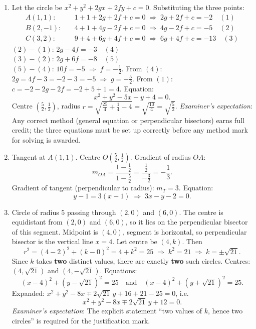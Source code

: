 \documentclass[11pt]{article}
\begin{document}
\begin{corrige}
\begin{enumerate}
\item Let the circle be $x^2 + y^2 + 2gx + 2fy + c = 0$. Substituting the three points:
\begin{align*}
A(1,1):&\quad 1+1+2g+2f+c = 0 \;\Longrightarrow\; 2g+2f+c = -2 \quad (1)\\
B(2,-1):&\quad 4+1+4g-2f+c = 0 \;\Longrightarrow\; 4g-2f+c = -5 \quad (2)\\
C(3,2):&\quad 9+4+6g+4f+c = 0 \;\Longrightarrow\; 6g+4f+c = -13 \quad (3)
\end{align*}
$(2)-(1)$: $2g - 4f = -3 \quad (4)$\\
$(3)-(2)$: $2g + 6f = -8 \quad (5)$\\
$(5)-(4)$: $10f = -5 \;\Longrightarrow\; f = -\frac{1}{2}$.
From $(4)$: $2g = 4f - 3 = -2 - 3 = -5 \;\Longrightarrow\; g = -\frac{5}{2}$.
From $(1)$: $c = -2 - 2g - 2f = -2 + 5 + 1 = 4$.
Equation:
\[ \boxed{x^2 + y^2 - 5x - y + 4 = 0.} \]
Centre $\left(\frac{5}{2}, \frac{1}{2}\right)$, radius $r = \sqrt{\frac{25}{4} + \frac{1}{4} - 4} = \sqrt{\frac{10}{4}} = \sqrt{\frac{5}{2}}$.
\emph{Examiner's expectation}: Any correct method (general equation or perpendicular bisectors) earns full credit; the three equations must be set up correctly before any method mark for solving is awarded.

\item Tangent at $A(1,1)$. Centre $O\left(\frac{5}{2}, \frac{1}{2}\right)$.
Gradient of radius $OA$:
\[ m_{OA} = \frac{1 - \frac{1}{2}}{1 - \frac{5}{2}} = \frac{\frac{1}{2}}{-\frac{3}{2}} = -\frac{1}{3}. \]
Gradient of tangent (perpendicular to radius): $m_T = 3$.
Equation:
\[ y - 1 = 3(x - 1) \;\Longrightarrow\; \boxed{3x - y - 2 = 0.} \]

\item Circle of radius $5$ passing through $(2,0)$ and $(6,0)$.
The centre is equidistant from $(2,0)$ and $(6,0)$, so it lies on the perpendicular bisector of this segment.
Midpoint is $(4,0)$, segment is horizontal, so perpendicular bisector is the vertical line $x = 4$.
Let centre be $(4, k)$. Then
\[ r^2 = (4-2)^2 + (k-0)^2 = 4 + k^2 = 25 \;\Longrightarrow\; k^2 = 21 \;\Longrightarrow\; k = \pm\sqrt{21}. \]
Since $k$ takes \textbf{two} distinct values, there are exactly \textbf{two} such circles.
Centres: $(4, \sqrt{21})$ and $(4, -\sqrt{21})$.
Equations:
\[ \boxed{(x-4)^2 + (y - \sqrt{21})^2 = 25 \quad\text{and}\quad (x-4)^2 + (y + \sqrt{21})^2 = 25.} \]
Expanded: $x^2 + y^2 - 8x \mp 2\sqrt{21}\,y + 16 + 21 - 25 = 0$, i.e.
\[ \boxed{x^2 + y^2 - 8x \mp 2\sqrt{21}\,y + 12 = 0.} \]
\emph{Examiner's expectation}: The explicit statement ``two values of $k$, hence two circles'' is required for the justification mark.
\end{enumerate}
\end{corrige}
\end{document}

